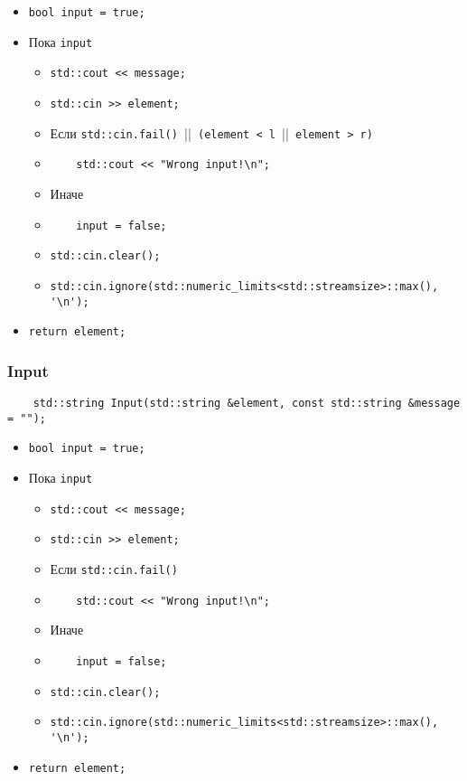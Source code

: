\begin{itemize}
	\item \verb|bool input = true;|
	\item Пока \verb|input|
		\begin{itemize}
			\item \verb|std::cout << message;|
			\item \verb|std::cin >> element;|
			\item Если \verb|std::cin.fail() |||\verb| (element < l |||\verb| element > r)|
			\item \verb|    std::cout << "Wrong input!\n";|
			\item Иначе
			\item \verb|    input = false;|
			\item \verb|std::cin.clear();|
			\item \verb|std::cin.ignore(std::numeric_limits<std::streamsize>::max(), '\n');|
		\end{itemize}
    \item \verb|return element;|
\end{itemize}


\subsubsection*{Input}

\begin{lstlisting}
	std::string Input(std::string &element, const std::string &message = "");
\end{lstlisting}

\begin{itemize}
	\item \verb|bool input = true;|
	\item Пока \verb|input|
		\begin{itemize}
			\item \verb|std::cout << message;|
			\item \verb|std::cin >> element;|
			\item Если \verb|std::cin.fail()|
			\item \verb|    std::cout << "Wrong input!\n";|
			\item Иначе
			\item \verb|    input = false;|
			\item \verb|std::cin.clear();|
			\item \verb|std::cin.ignore(std::numeric_limits<std::streamsize>::max(), '\n');|
		\end{itemize}
    \item \verb|return element;|
\end{itemize}


